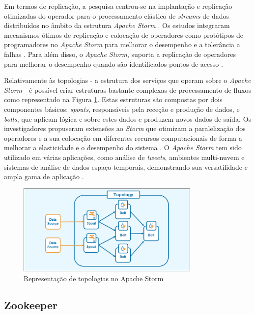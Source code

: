 Em termos de replicação, a pesquisa centrou-se na implantação e replicação otimizadas do 
operador para o processamento elástico de \textit{streams} de dados distribuídos no âmbito 
da estrutura \textit{Apache Storm} \cite{storm2017b}. Os estudos integraram mecanismos ótimos de
replicação e colocação de operadores como protótipos de programadores no \textit{Apache Storm} para
melhorar o desempenho e a tolerância a falhas \cite{storm2017c}. Para além disso, o 
\textit{Apache Storm}, suporta a replicação de operadores para melhorar o desempenho quando são 
identificados pontos de acesso \cite{storm2018c}.

Relativamente às topologias - a estrutura dos serviços que operam sobre o \textit{Apache Storm} - 
é possível criar estruturas bastante complexas de processamento de fluxos como representado na
Figura \ref{fig:topologies}. Estas estruturas são compostas por dois componentes básicos: 
\textit{spouts}, responsáveis pela receção e produção de dados, e \textit{bolts}, que aplicam 
lógica e sobre estes dados e produzem novos dados de saída. Os investigadores propuseram extensões 
ao \textit{Storm} que otimizam a paralelização dos operadores e a sua colocação em diferentes 
recursos computacionais de forma a melhorar a elasticidade e o desempenho do sistema 
\cite{storm2017d} . O \textit{Apache Storm} tem sido utilizado em várias aplicações, como análise 
de \textit{tweets}, ambientes multi-nuvem e sistemas de análise de dados espaço-temporais, 
demonstrando sua versatilidade e ampla gama de aplicação \cite{storm2018d} \cite{storm2020} 
\cite{storm2021}.

\begin{figure}[H]
    \centering
    \includegraphics[width=0.8\textwidth]{media/content/estado-arte/apache-storm-topology-diagram.png}
    \caption{Representação de topologias no Apache Storm}
    \label{fig:topologies}
\end{figure}

\subsection{Zookeeper}

